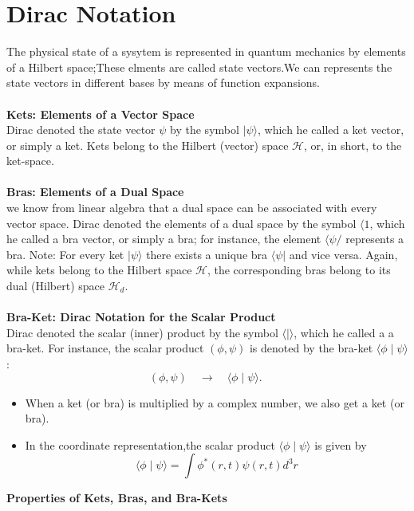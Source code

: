 \section{Dirac Notation}
The physical state of a sysytem is represented in quantum mechanics by elements of a Hilbert space;These elments are called state vectors.We can represents the state vectors in different bases by means of function expansions.\\\\
\textbf{Kets: Elements of a Vector Space}\\
Dirac denoted the state vector $\psi $ by the symbol $|\psi\rangle$, which he called a ket vector, or simply a ket. Kets belong to the Hilbert (vector) space $\mathcal{H}$, or, in short, to the ket-space.\\\\
\textbf{Bras: Elements of a Dual Space}\\
 we know from linear algebra that a dual space can be associated with every vector space. Dirac denoted the elements of a dual space by the symbol $\langle 1$, which he called a bra vector, or simply a bra; for instance, the element $\langle\psi /$ represents a bra. Note: For every ket $|\psi\rangle$ there exists a unique bra $\langle\psi|$ and vice versa. Again, while kets belong to the Hilbert space $\mathcal{H}$, the corresponding bras belong to its dual (Hilbert) space $\mathcal{H}_{d}$.\\\\
 \textbf{Bra-Ket: Dirac Notation for the Scalar Product}\\
 Dirac denoted the scalar (inner) product by the symbol $\langle\mid\rangle$, which he called a a bra-ket. For instance, the scalar product $(\phi, \psi)$ is denoted by the bra-ket $\langle\phi \mid \psi\rangle$ :
 $$
 (\phi, \psi) \quad \longrightarrow \quad\langle\phi \mid \psi\rangle \text {. }
 $$
 \begin{note}
 	\begin{itemize}
 		\item When a ket (or bra) is multiplied by a complex number, we also get a ket (or bra).
 		\item In the coordinate representation,the scalar product $\langle\phi \mid \psi\rangle$ is given by\\
 		$$\langle\phi \mid \psi\rangle=\int \phi^*(r,t)\psi(r,t)d^3r$$
 	\end{itemize}
 \end{note}
\newpage
\textbf{ Properties of Kets, Bras, and Bra-Kets}  \\
